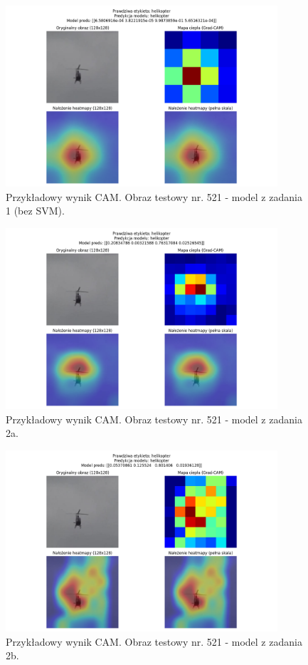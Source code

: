 \begin{figure}[H]
    \centering
    \includegraphics[width=0.9\textwidth]{img/zad3/modelzad1_heatmap_521_true_helikopter_pred_helikopter.png}
    \caption{Przykładowy wynik CAM. Obraz testowy nr. 521 - model z zadania 1 (bez SVM).}
    \label{fig:z3_cam}
\end{figure}
\begin{figure}[H]
    \centering
    \includegraphics[width=0.9\textwidth]{img/zad3/modelzad2aheatmap_521_true_helikopter_pred_helikopter.png}
    \caption{Przykładowy wynik CAM. Obraz testowy nr. 521 - model z zadania 2a.}
    \label{fig:z3_cam}
\end{figure}
\begin{figure}[H]
    \centering
    \includegraphics[width=0.9\textwidth]{img/zad3/modelzad2b_heatmap_521_true_helikopter_pred_helikopter.png}
    \caption{Przykładowy wynik CAM. Obraz testowy nr. 521 - model z zadania 2b.}
    \label{fig:z3_cam}
\end{figure}
